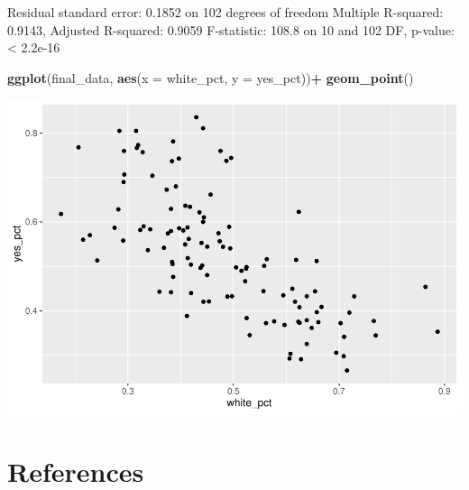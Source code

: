 \documentclass[
]{article}
\newenvironment{Shaded}{\begin{snugshade}}{\end{snugshade}}
\newcommand{\DataTypeTok}[1]{\textcolor[rgb]{0.13,0.29,0.53}{#1}}
\newcommand{\KeywordTok}[1]{\textcolor[rgb]{0.13,0.29,0.53}{\textbf{#1}}}
\newcommand{\NormalTok}[1]{#1}
\newcommand{\OperatorTok}[1]{\textcolor[rgb]{0.81,0.36,0.00}{\textbf{#1}}}
\newcommand{\StringTok}[1]{\textcolor[rgb]{0.31,0.60,0.02}{#1}}
\begin{document}
Residual standard error: 0.1852 on 102 degrees of freedom Multiple
R-squared: 0.9143, Adjusted R-squared: 0.9059 F-statistic: 108.8 on 10
and 102 DF, p-value: \textless{} 2.2e-16

\begin{Shaded}
\begin{Highlighting}[]
\KeywordTok{ggplot}\NormalTok{(final_data, }\KeywordTok{aes}\NormalTok{(}\DataTypeTok{x =}\NormalTok{ white_pct, }\DataTypeTok{y =}\NormalTok{ yes_pct))}\OperatorTok{+}
\StringTok{   }\KeywordTok{geom_point}\NormalTok{()}
\end{Highlighting}
\end{Shaded}

\includegraphics{Zhong_paper_files/figure-latex/unnamed-chunk-16-1.pdf}

\hypertarget{references}{%
\section{References}\label{references}}
\end{document}

